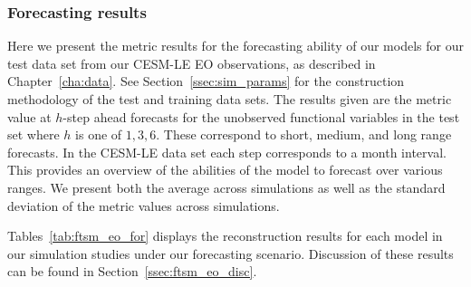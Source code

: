 \subsubsection{Forecasting results}
Here we present the metric results for the forecasting ability of our models for our test data set from our CESM-LE EO observations, as described in Chapter~\ref{cha:data}.
See Section~\ref{ssec:sim_params} for the construction methodology of the test and training data sets. 
The results given are the metric value at $h$-step ahead forecasts for the unobserved functional variables in the test set where $h$ is one of $1, 3, 6$. 
These correspond to short, medium, and long range forecasts.
In the CESM-LE data set each step corresponds to a month interval.
This provides an overview of the abilities of the model to forecast over various ranges.
We present both the average across simulations as well as the standard deviation of the metric values across simulations.

Tables~\ref{tab:ftsm_eo_for} displays the reconstruction results for each model in our simulation studies under our forecasting scenario. 
Discussion of these results can be found in Section~\ref{ssec:ftsm_eo_disc}.

